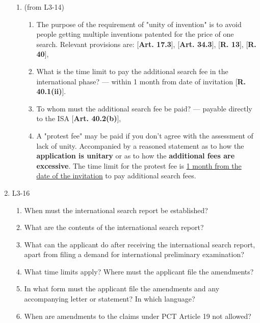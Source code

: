 \documentclass{report}
\begin{document}
\begin{enumerate}[label=\textbf{Answer \arabic*}]
\begin{enumerate}[label=(\alph*)]
        \item (from L3-14)
        \begin{enumerate}[label={(\alph{enumi}.\arabic*)}]
            \item The purpose of the requirement of "unity of invention" is to avoid people getting multiple inventions patented for the price of one search. Relevant provisions are: [\textbf{Art. 17.3}], [\textbf{Art. 34.3}], [\textbf{R. 13}], [\textbf{R. 40}],
            \item What is the time limit to pay the additional search fee in the international phase? --- within 1 month from date of invitation [\textbf{R. 40.1(ii)}].
            \item To whom must the additional search fee be paid? --- payable directly to the ISA [\textbf{Art. 40.2(b)}],
            \item A "protest fee" may be paid if you don't agree with the assessment of lack of unity. Accompanied by a reasoned statement as to how the \textbf{application is unitary} or as to how the \textbf{additional fees are excessive}. The time limit for the protest fee is \underline{1 month from the date of the invitation} to pay additional search fees. 
        \end{enumerate}
    \end{enumerate}

    \item %
    L3-16 
    \begin{enumerate}[label=(\alph*)]
        \item When must the international search report be established?
        \item What are the contents of the international search report?
        \item What can the applicant do after receiving the international search report, apart from filing a demand for international preliminary examination?
        \item What time limits apply? Where must the applicant file the amendments?
        \item In what form must the applicant file the amendments and any accompanying letter or statement? In which language?
        \item When are amendments to the claims under PCT Article 19 not allowed?
    \end{enumerate}


\end{enumerate}
\end{document}
